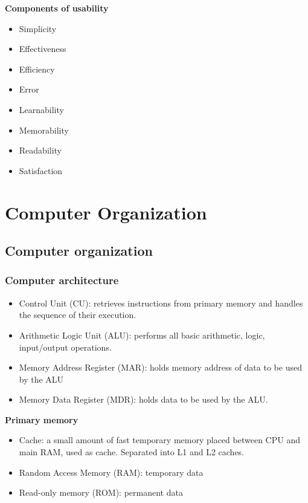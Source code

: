 \documentclass{article}
\begin{document}
\textbf{Components of usability}
\begin{itemize}
    \item Simplicity
    \item Effectiveness
    \item Efficiency
    \item Error
    \item Learnability
    \item Memorability
    \item Readability
    \item Satisfaction
\end{itemize}

\section{Computer Organization}

\subsection{Computer organization}

\subsubsection{Computer architecture}

\begin{itemize}
    \item Control Unit (CU): retrieves instructions from primary memory and
        handles the sequence of their execution.
    \item Arithmetic Logic Unit (ALU): performs all basic arithmetic, logic,
        input/output operations.
    \item Memory Address Register (MAR): holds memory address of data to be
        used by the ALU
    \item Memory Data Register (MDR): holds data to be used by the ALU.
\end{itemize}

\textbf{Primary memory}
\begin{itemize}
    \item Cache: a small amount of fast temporary memory placed between CPU
        and main RAM, used as cache. Separated into L1 and L2 caches.
    \item Random Access Memory (RAM): temporary data 
    \item Read-only memory (ROM): permanent data
\end{itemize}
\end{document}
